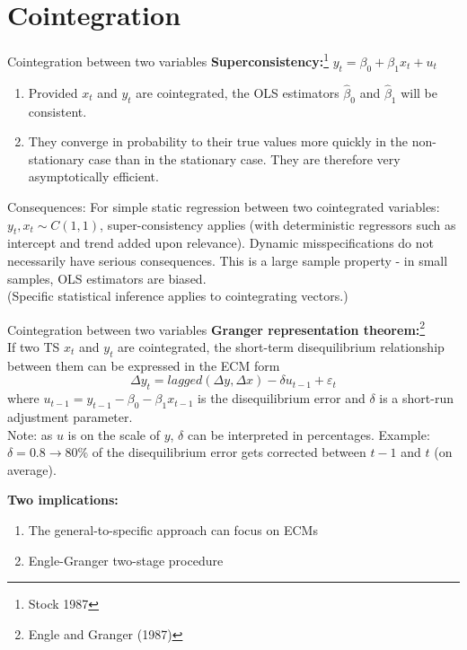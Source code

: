 \documentclass{beamer}
\begin{document}

\section{Cointegration}

\begin{frame}{Cointegration between two variables}
\textbf{Superconsistency:}\footnote{Stock 1987} $y_t =  \beta_0 + \beta_1 x_t + u_t$\\
\begin{enumerate}
\item Provided $x_t$ and $y_t$ are cointegrated, the OLS estimators $\hat{\beta}_0$ and $\hat{\beta}_1$ will be consistent. 
\item They converge in probability to their true values more quickly in the non-stationary case than in the stationary case. They are therefore very asymptotically efficient.
\end{enumerate}
\begin{block}{Consequences:}
For simple static regression between two cointegrated variables: $y_t, x_t \sim C(1,1)$, super-consistency applies (with deterministic regressors such as intercept and trend added upon relevance). Dynamic misspecifications do not necessarily have serious consequences. This is a large sample property - in small samples, OLS estimators are biased.\\ (Specific statistical inference applies to cointegrating vectors.)
\end{block}
\end{frame}


\begin{frame}{Cointegration between two variables}
\textbf{Granger representation theorem:}\footnote{Engle and Granger (1987)}\\
If two TS $x_t$ and $y_t$ are cointegrated, the short-term disequilibrium relationship between them can be expressed in the ECM form
\vspace{-0.2cm}
\begin{equation} \label{eq6}
 \Delta y_t = lagged(\Delta y, \Delta x) - \delta u_{t-1} + \varepsilon_t 
\end{equation}
where $u_{t-1} = y_{t-1} - \beta_0 - \beta_1 x_{t-1}$ is the disequilibrium error and $\delta$ is a short-run adjustment parameter. \\
\footnotesize{Note: as $u$ is on the scale of $y$, $\delta$ can be interpreted in percentages. Example: $\delta = 0.8 \rightarrow 80 \%$ of the disequilibrium error gets corrected between $t-1$ and $t$ (on average).}
\vspace{0.1cm}

\textbf{Two implications:}
\begin{enumerate}
\item The general-to-specific approach can focus on ECMs
\item Engle-Granger two-stage procedure
\end{enumerate}
\end{frame}
\end{document}

